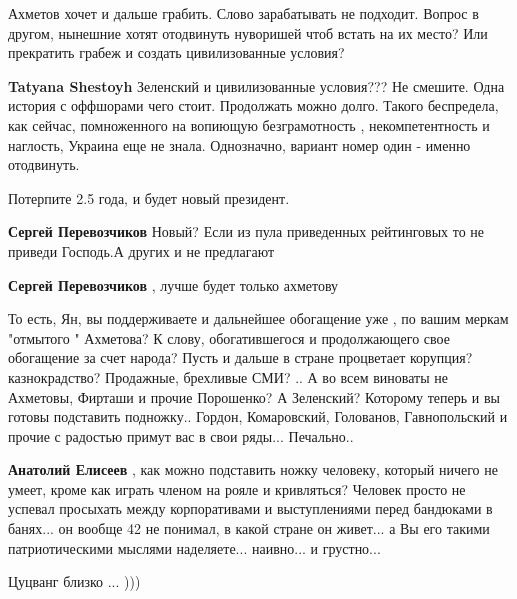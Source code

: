 \begin{itemize}

Ахметов хочет и дальше грабить. Слово зарабатывать не подходит. Вопрос в
другом, нынешние хотят отодвинуть нуворишей чтоб встать на их место? Или
прекратить грабеж и создать цивилизованные условия?

\begin{itemize} %
\textbf{Tatyana Shestoyh} Зеленский и цивилизованные условия??? Не смешите. Одна история с оффшорами чего стоит. Продолжать можно долго. Такого беспредела, как сейчас, помноженного на вопиющую безграмотность , некомпетентность и наглость, Украина еще не знала. Однозначно, вариант номер один - именно отодвинуть.
\end{itemize} %

Потерпите 2.5 года, и будет новый президент.

\begin{itemize} %
\textbf{Сергей Перевозчиков} Новый? Если из пула приведенных рейтинговых то не приведи Господь.А других и не предлагают

\textbf{Сергей Перевозчиков} , лучше будет только ахметову
\end{itemize} %


То есть, Ян, вы поддерживаете и дальнейшее обогащение уже , по вашим меркам
"отмытого " Ахметова? К слову, обогатившегося и продолжающего свое обогащение
за счет народа? Пусть и дальше в стране процветает корупция? казнокрадство?
Продажные, брехливые СМИ? .. А во всем виноваты не Ахметовы, Фирташи и прочие
Порошенко? А Зеленский? Которому теперь и вы готовы подставить подножку..
Гордон, Комаровский, Голованов, Гавнопольский и прочие с радостью примут вас в
свои ряды... Печально..

\begin{itemize} %
\textbf{Анатолий Елисеев} , как можно подставить ножку человеку, который ничего не умеет, кроме как играть членом на рояле и кривляться? Человек просто не успевал просыхать между корпоративами и выступлениями перед бандюками в банях... он вообще 42 не понимал, в какой стране он живет... а Вы его такими патриотическими мыслями наделяете... наивно... и грустно...
\end{itemize} %


Цуцванг близко ... )))


\end{itemize}
